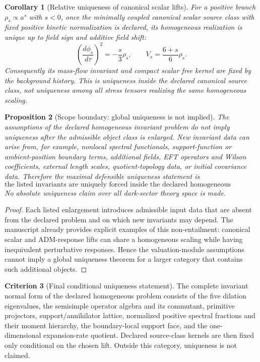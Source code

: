 \documentclass[11pt,a4paper]{article}
\def\dd{d}%
\numberwithin{equation}{section}
\theoremstyle{definition}
\newtheorem{criterion}{Criterion}
\theoremstyle{plain}
\newtheorem{proposition}[criterion]{Proposition}
\newtheorem{corollary}[criterion]{Corollary}
\theoremstyle{remark}
\newcommand{\dd}{\mathrm{d}}
\begin{document}
\begin{corollary}[Relative uniqueness of canonical scalar lifts]
For a positive branch \(\rho_s\propto a^s\) with \(s<0\), once the minimally
coupled canonical scalar source class with fixed positive kinetic normalization
is declared, its homogeneous realization is unique up to field sign and
additive field shift:
\begin{equation}
\left(\frac{\dd\phi_s}{\dd\tau}\right)^2=-\frac{s}{3}\rho_s,
\qquad
V_s=\frac{6+s}{6}\rho_s.
\end{equation}
Consequently its mass-flow invariant and compact scalar free kernel are fixed by
the background history.  This is uniqueness inside the declared canonical
source class, not uniqueness among all stress tensors realizing the same
homogeneous scaling.
\end{corollary}

\begin{proposition}[Scope boundary: global uniqueness is not implied]
\label{prop:no-global-uniqueness}
The assumptions of the declared homogeneous invariant problem do not imply
uniqueness after the admissible object class is enlarged.  New invariant data
can arise from, for example, nonlocal spectral functionals, support-function or
ambient-position boundary terms, additional fields, EFT operators and Wilson
coefficients, external length scales, quotient-topology data, or initial
covariance data.  Therefore the maximal defensible uniqueness statement is
\begin{equation}
\boxed{
\text{the listed invariants are uniquely forced inside the declared homogeneous valuation category.}}
\end{equation}
No absolute uniqueness claim over all dark-sector theory space is made.
\end{proposition}
\begin{proof}
Each listed enlargement introduces admissible input data that are absent from
the declared problem and on which new invariants may depend.  The manuscript
already provides explicit examples of this non-entailment: canonical scalar and
ADM-response lifts can share a homogeneous scaling while having inequivalent
perturbative responses.  Hence the valuation-module assumptions cannot imply a
global uniqueness theorem for a larger category that contains such additional
objects.
\end{proof}

\begin{criterion}[Final conditional uniqueness statement]
The complete invariant normal form of the declared homogeneous problem consists
of the five dilation eigenvalues, the semisimple operator algebra and its
commutant, primitive projectors, support/annihilator lattice, normalized positive
spectral fractions and their moment hierarchy, the boundary-local support face,
and the one-dimensional expansion-rate quotient.  Declared source-class kernels
are then fixed only conditional on the chosen lift.  Outside this category,
uniqueness is not claimed.
\end{criterion}
\end{document}
